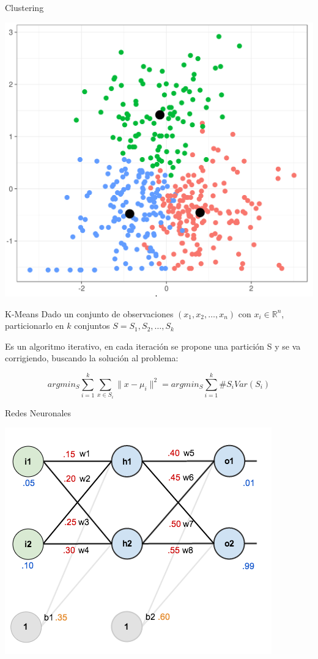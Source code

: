 \documentclass[12pt,aspectratio=169]{beamer}
\begin{document}
\begin{frame}{Clustering}
	\begin{center}
	\includegraphics[width=.5\paperwidth]{kmeans.png}
	\end{center}

\end{frame}

\begin{frame}{K-Means}
Dado un conjunto de observaciones $(x_1, x_2, \dots, x_n)$ con $x_i \in \mathbb{R}^n$, particionarlo en $k$ conjuntos $S = {S_1, S_2, \dots, S_k}$

Es un algoritmo iterativo, en cada iteración se propone una partición S y se va corrigiendo, buscando la solución al problema:

$$
argmin_S \sum_{i=1}^{k}\sum_{x \in S_i} \|x-\mu_i\|^2 =
argmin_S \sum_{i=1}^{k}\#S_i Var(S_i)
$$

\end{frame}

\begin{frame}{Redes Neuronales}
\begin{center}
	\includegraphics[width=.5\paperwidth]{neuralnet.png}
\end{center}
\end{frame}
\end{document}

